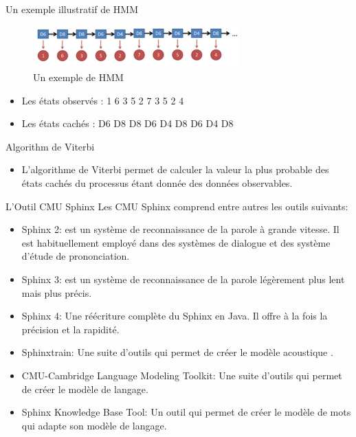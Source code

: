 \begin{frame}{Un exemple illustratif de HMM}

\begin{figure}
\centering
\includegraphics[width=8cm]{images/hmm1.png}
\caption{Un exemple de HMM}
\end{figure}
\begin{itemize}
\item Les états observés : 1 6 3 5 2 7 3 5 2 4
\item Les états cachés : D6 D8 D8 D6 D4 D8 D6 D4 D8
\end{itemize}

\end{frame}

\begin{frame}{Algorithm de Viterbi}

\begin{itemize}
\item L’algorithme de Viterbi permet de calculer
la valeur la plus probable des états cachés du processus
étant donnée des données observables. 
\end{itemize}

\end{frame}


\begin{frame}{L'Outil CMU Sphinx}
Les CMU Sphinx comprend entre autres les outils suivants:
\begin{itemize}
\item Sphinx 2: est un système de reconnaissance de la parole à grande vitesse. Il est habituellement employé dans des systèmes de dialogue et des système d'étude de prononciation.
\item Sphinx 3: est un système de reconnaissance de la parole légèrement plus lent mais plus précis.
\item Sphinx 4: Une réécriture complète du Sphinx en Java. Il offre à la fois la précision et la rapidité.
\item Sphinxtrain: Une suite d'outils qui permet de créer le modèle acoustique .
\item CMU-Cambridge Language Modeling Toolkit: Une suite d'outils qui permet de créer le modèle de langage.
\item Sphinx Knowledge Base Tool: Un outil qui permet de créer le modèle de mots qui adapte son modèle de langage. 
\end{itemize}

\end{frame}

